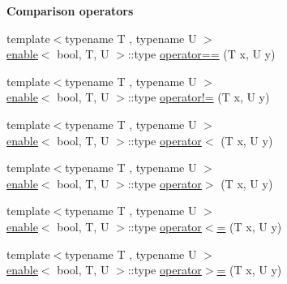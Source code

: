\begin{Indent}\textbf{ Comparison operators}\par
\begin{DoxyCompactItemize}
\item 
{\footnotesize template$<$typename T , typename U $>$ }\\\hyperlink{structhalf__float_1_1detail_1_1enable}{enable}$<$ bool, T, U $>$\+::type \hyperlink{namespacehalf__float_1_1detail_a6c0b83f30940719c1dd8f5a85323388a}{operator==} (T x, U y)
\item 
{\footnotesize template$<$typename T , typename U $>$ }\\\hyperlink{structhalf__float_1_1detail_1_1enable}{enable}$<$ bool, T, U $>$\+::type \hyperlink{namespacehalf__float_1_1detail_a387b8a8af08fba40aff80054f52d0ba0}{operator!=} (T x, U y)
\item 
{\footnotesize template$<$typename T , typename U $>$ }\\\hyperlink{structhalf__float_1_1detail_1_1enable}{enable}$<$ bool, T, U $>$\+::type \hyperlink{namespacehalf__float_1_1detail_afe873e6cae401e97d4d8d88c08eb29e0}{operator$<$} (T x, U y)
\item 
{\footnotesize template$<$typename T , typename U $>$ }\\\hyperlink{structhalf__float_1_1detail_1_1enable}{enable}$<$ bool, T, U $>$\+::type \hyperlink{namespacehalf__float_1_1detail_ab5bceccadce3723b7c7b25dc63760025}{operator$>$} (T x, U y)
\item 
{\footnotesize template$<$typename T , typename U $>$ }\\\hyperlink{structhalf__float_1_1detail_1_1enable}{enable}$<$ bool, T, U $>$\+::type \hyperlink{namespacehalf__float_1_1detail_a0588a6476f8569f2b81dd99d4e87d83b}{operator$<$=} (T x, U y)
\item 
{\footnotesize template$<$typename T , typename U $>$ }\\\hyperlink{structhalf__float_1_1detail_1_1enable}{enable}$<$ bool, T, U $>$\+::type \hyperlink{namespacehalf__float_1_1detail_ad5a5e2d4da6f36b5b6ee2dced3fb3e72}{operator$>$=} (T x, U y)
\end{DoxyCompactItemize}
\end{Indent}
